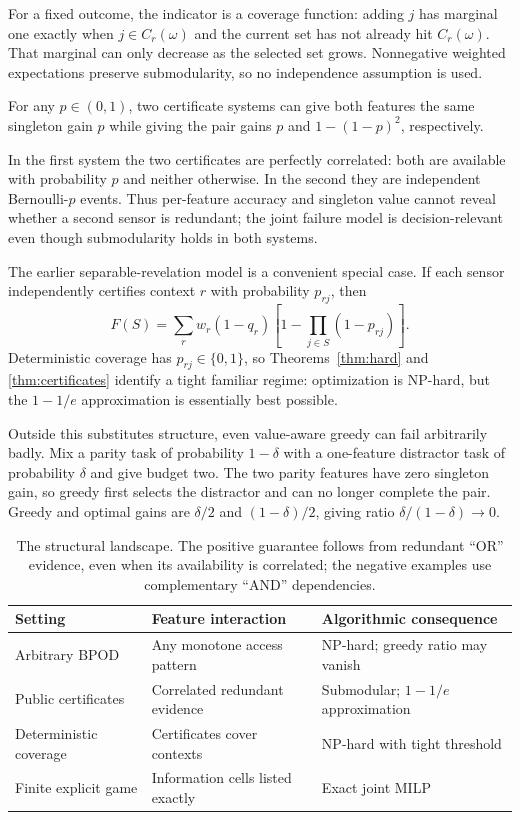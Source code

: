 For a fixed outcome, the indicator is a coverage function: adding $j$ has marginal one exactly when $j\in C_r(\omega)$ and the current set has not already hit $C_r(\omega)$. That marginal can only decrease as the selected set grows. Nonnegative weighted expectations preserve submodularity, so no independence assumption is used.

\begin{proposition}\label{prop:marginals}
For any $p\in(0,1)$, two certificate systems can give both features the same singleton gain $p$ while giving the pair gains $p$ and $1-(1-p)^2$, respectively.
\end{proposition}
In the first system the two certificates are perfectly correlated: both are available with probability $p$ and neither otherwise. In the second they are independent Bernoulli-$p$ events. Thus per-feature accuracy and singleton value cannot reveal whether a second sensor is redundant; the joint failure model is decision-relevant even though submodularity holds in both systems.

The earlier separable-revelation model is a convenient special case. If each sensor independently certifies context $r$ with probability $p_{rj}$, then
\[
F(S)=\sum_r w_r(1-q_r)
\left[1-\prod_{j\in S}(1-p_{rj})\right].
\]
Deterministic coverage has $p_{rj}\in\{0,1\}$, so Theorems~\ref{thm:hard} and \ref{thm:certificates} identify a tight familiar regime: optimization is NP-hard, but the $1-1/e$ approximation is essentially best possible.

Outside this substitutes structure, even value-aware greedy can fail arbitrarily badly. Mix a parity task of probability $1-\delta$ with a one-feature distractor task of probability $\delta$ and give budget two. The two parity features have zero singleton gain, so greedy first selects the distractor and can no longer complete the pair. Greedy and optimal gains are $\delta/2$ and $(1-\delta)/2$, giving ratio $\delta/(1-\delta)\to0$.

\begin{table}[t]
\centering
\small
\begin{tabular}{@{}p{}p{}p{}@{}}
\toprule
Setting & Feature interaction & Algorithmic consequence \\
\midrule
Arbitrary BPOD & Any monotone access pattern & NP-hard; greedy ratio may vanish \\
Public certificates & Correlated redundant evidence & Submodular; $1-1/e$ approximation \\
Deterministic coverage & Certificates cover contexts & NP-hard with tight threshold \\
Finite explicit game & Information cells listed exactly & Exact joint MILP \\
\bottomrule
\end{tabular}
\caption{The structural landscape. The positive guarantee follows from redundant ``OR'' evidence, even when its availability is correlated; the negative examples use complementary ``AND'' dependencies.}
\label{tab:landscape}
\end{table}

